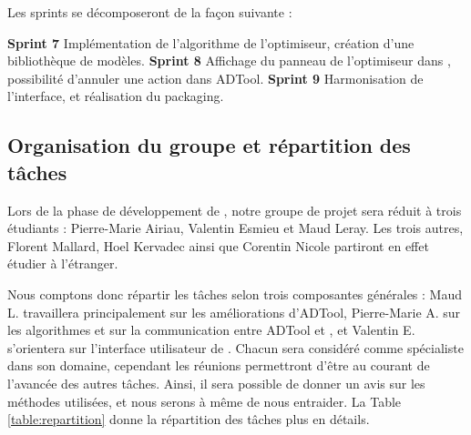             Les sprints se décomposeront de la façon suivante :

            \noindent\textbf{Sprint 7} Implémentation de l'algorithme de l'optimiseur, création d'une bibliothèque de modèles.\newline
            \textbf{Sprint 8} Affichage du panneau de l'optimiseur dans \glasir{}, possibilité d'annuler une action dans ADTool.\newline
            \textbf{Sprint 9} Harmonisation de l'interface, et réalisation du packaging. \newline
    
    \subsection{Organisation du groupe et répartition des tâches}
        Lors de la phase de développement de \glasir{}, notre groupe de projet sera réduit à trois étudiants : Pierre-Marie {\sc Airiau}, Valentin {\sc Esmieu} et Maud {\sc Leray}. Les trois autres, Florent {\sc Mallard}, Hoel {\sc Kervadec} ainsi que Corentin {\sc Nicole} partiront en effet étudier à l'étranger.
        
        Nous comptons donc répartir les tâches selon trois composantes générales : Maud L. travaillera principalement sur les améliorations d'ADTool, Pierre-Marie A. sur les algorithmes et sur la communication entre ADTool et \glasir{}, et Valentin E. s'orientera sur l'interface utilisateur de \glasir{}. Chacun sera considéré comme \og spécialiste \fg{} dans son domaine, cependant les réunions permettront d'être au courant de l'avancée des autres tâches. Ainsi, il sera possible de donner un avis sur les méthodes utilisées, et nous serons à même de nous entraider. La {\sc Table} \ref{table:repartition} donne la répartition des tâches plus en détails.


